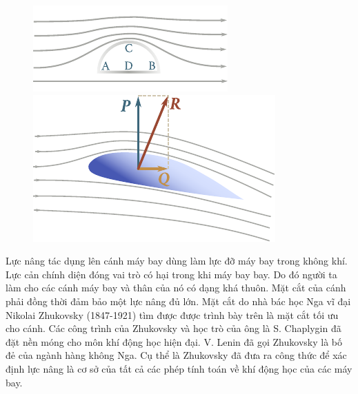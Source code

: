 \begin{figure}[!htb]
	\begin{minipage}[t]{0.5\linewidth}
		\begin{center}
			\includegraphics[scale=1.0]{figures/ch_09/fig_9_18.pdf}
			\caption[]{}
			\label{fig:9_18}
		\end{center}
	\end{minipage}
	\hspace{-0.1cm}
	\begin{minipage}[t]{0.5\linewidth}
		\begin{center}
			\includegraphics[scale=1.0]{figures/ch_09/fig_9_19.pdf}
			\caption[]{}
			\label{fig:9_19}
		\end{center}
	\end{minipage}
	\vspace{-0.5cm}
\end{figure}


Lực nâng tác dụng lên cánh máy bay dùng làm lực đỡ máy bay trong không khí. Lực cản chính diện đóng vai trò có hại trong khi máy bay bay. Do đó người ta làm cho các cánh máy bay và thân của nó có dạng khá thuôn. Mặt cắt của cánh phải đồng thời đảm bảo một lực nâng đủ lớn. Mặt cắt do nhà bác học Nga vĩ đại Nikolai Zhukovsky (1847-1921) tìm được được trình bày trên  là mặt cắt tối ưu cho cánh. Các công trình của Zhukovsky và học trò của ông là S. Chaplygin đã đặt nền móng cho môn khí động học hiện đại. V. Lenin đã gọi Zhukovsky là bố đẻ của ngành hàng không Nga. Cụ thể là Zhukovsky đã đưa ra công thức để xác định lực nâng là cơ sở của tất cả các phép tính toán về khí động học của các máy bay.
